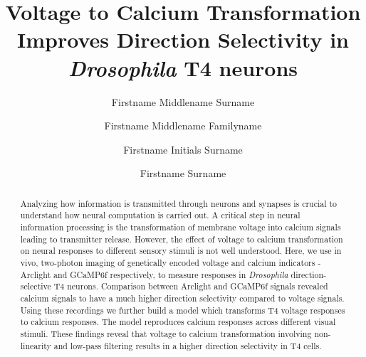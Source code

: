 \documentclass[9pt,lineno]{elife}
\title{Voltage to Calcium Transformation Improves Direction Selectivity in \textit{Drosophila} T4 neurons}
\author[1*]{Firstname Middlename Surname}
\author[1,2\authfn{1}\authfn{3}]{Firstname Middlename Familyname}
\author[2\authfn{1}\authfn{4}]{Firstname Initials Surname}
\author[2*]{Firstname Surname}
\affil[1]{Max Planck Institute of Neurobiology, Martinsried, Germany}
\begin{document}
\maketitle

\begin{abstract}
Analyzing how information is transmitted through neurons and synapses is crucial to understand how neural computation is carried out. A critical step in neural information processing is the transformation of membrane voltage into calcium signals leading to transmitter release. However, the effect of voltage to calcium transformation on neural responses to different sensory stimuli is not well understood. Here, we use in vivo, two-photon imaging of genetically encoded voltage and calcium indicators - Arclight and GCaMP6f respectively, to measure responses in \textit{Drosophila} direction-selective T4 neurons. Comparison between Arclight and GCaMP6f signals revealed calcium signals to have a much higher direction selectivity compared to voltage signals. Using these recordings we further build a model which transforms T4 voltage responses to calcium responses. The model reproduces calcium responses across different visual stimuli. These findings reveal that voltage to calcium transformation involving non-linearity and low-pass filtering results in a higher direction selectivity in T4 cells.


\end{abstract}
\end{document}
